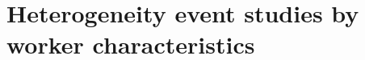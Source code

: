 \clearpage
\section{ Heterogeneity event studies by worker characteristics}
\label{appendix_worker_char}

